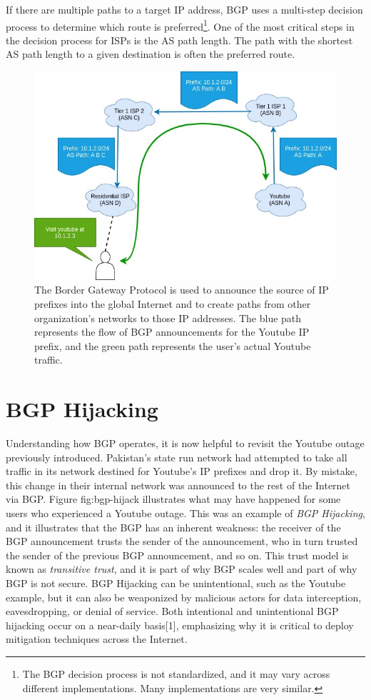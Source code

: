 \documentclass[conference]{IEEEtran}
\begin{document}
If there are multiple paths to a target IP address, BGP uses a multi-step decision process to determine which route is preferred\footnote{The BGP decision process is not standardized, and it may vary across different implementations.  Many implementations are very similar.}.  One of the most critical steps in the decision process for ISPs is the AS path length.  The path with the shortest AS path length to a given destination is often the preferred route.

\begin{figure}
  \includegraphics[width=\linewidth]{images/bgp-ops.jpg}
  \caption{The Border Gateway Protocol is used to announce the source of IP prefixes into the global Internet and to create paths from other organization's networks to those IP addresses.  The blue path represents the flow of BGP announcements for the Youtube IP prefix, and the green path represents the user's actual Youtube traffic.}
  \label{fig:bgp-ops}
\end{figure}

\section{BGP Hijacking}
Understanding how BGP operates, it is now helpful to revisit the Youtube outage previously introduced.  Pakistan's state run network had attempted to take all traffic in its network destined for Youtube's IP prefixes and drop it.  By mistake, this change in their internal network was announced to the rest of the Internet via BGP.  Figure {fig:bgp-hijack} illustrates what may have happened for some users who experienced a Youtube outage.  This was an example of \emph{BGP Hijacking}, and it illustrates that the BGP has an inherent weakness: the receiver of the BGP announcement trusts the sender of the announcement, who in turn trusted the sender of the previous BGP announcement, and so on.  This trust model is known as \emph{transitive trust}, and it is part of why BGP scales well and part of why BGP is not secure.  BGP Hijacking can be unintentional, such as the Youtube example, but it can also be weaponized by malicious actors for data interception, eavesdropping, or denial of service.  Both intentional and unintentional BGP hijacking occur on a near-daily basis[1], emphasizing why it is critical to deploy mitigation techniques across the Internet.
\end{document}
